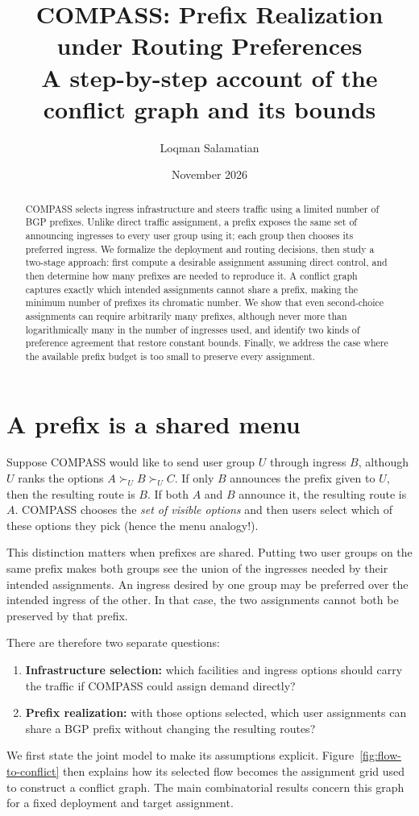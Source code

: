 \documentclass[10pt,a4paper]{article}
\title{COMPASS: Prefix Realization under Routing Preferences\\
\large A step-by-step account of the conflict graph and its bounds}
\author{Loqman Salamatian}
\date{November 2026}
\begin{document}
\maketitle

\begin{abstract}
COMPASS selects ingress infrastructure and steers traffic using a limited number of BGP prefixes. Unlike direct traffic assignment, a prefix exposes the same set of announcing ingresses to every user group using it; each group then chooses its preferred ingress. We formalize the deployment and routing decisions, then study a two-stage approach: first compute a desirable assignment assuming direct control, and then determine how many prefixes are needed to reproduce it. A conflict graph captures exactly which intended assignments cannot share a prefix, making the minimum number of prefixes its chromatic number. We show that even second-choice assignments can require arbitrarily many prefixes, although never more than logarithmically many in the number of ingresses used, and identify two kinds of preference agreement that restore constant bounds. Finally, we address the case where the available prefix budget is too small to preserve every assignment.
\end{abstract}

\section{A prefix is a shared menu}

Suppose COMPASS would like to send user group $U$ through ingress $B$, although $U$ ranks the options $A\succ_U B\succ_U C$. If only $B$ announces the prefix given to $U$, then the resulting route is $B$. If both $A$ and $B$ announce it, the resulting route is $A$. COMPASS chooses the \emph{set of visible options} and then users select which of these options they pick (hence the menu analogy!).

This distinction matters when prefixes are shared. Putting two user groups on the same prefix makes both groups see the union of the ingresses needed by their intended assignments. An ingress desired by one group may be preferred over the intended ingress of the other. In that case, the two assignments cannot both be preserved by that prefix.

There are therefore two separate questions:
\begin{enumerate}[leftmargin=*,itemsep=2pt]
\item \textbf{Infrastructure selection:} which facilities and ingress options should carry the traffic if COMPASS could assign demand directly?
\item \textbf{Prefix realization:} with those options selected, which user assignments can share a BGP prefix without changing the resulting routes?
\end{enumerate}
We first state the joint model to make its assumptions explicit. Figure~\ref{fig:flow-to-conflict} then explains how its selected flow becomes the assignment grid used to construct a conflict graph. The main combinatorial results concern this graph for a fixed deployment and target assignment.
\end{document}
